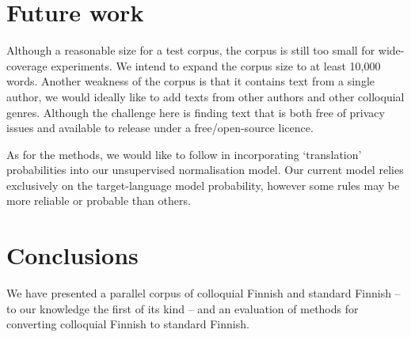 \documentclass[11pt]{article}
\begin{document}



\section{Future work}

Although a reasonable size for a test corpus, the corpus is still too small for 
wide-coverage experiments. We intend to expand the corpus size to at least 10,000
words. Another weakness of the corpus is that it contains text from a single author,
we would ideally like to add texts from other authors and other colloquial genres. Although
the challenge here is finding text that is both free of privacy issues and available
to release under a free/open-source licence.

As for the methods, we would like to follow  in incorporating
`translation' probabilities into our unsupervised normalisation model. Our current model relies 
exclusively on the target-language model probability, however some rules may be more
reliable or probable than others.

\section{Conclusions}

We have presented a parallel corpus of colloquial Finnish and standard Finnish --
to our knowledge the first of its kind -- and an evaluation of methods for 
converting colloquial Finnish to standard Finnish. 
\end{document}
